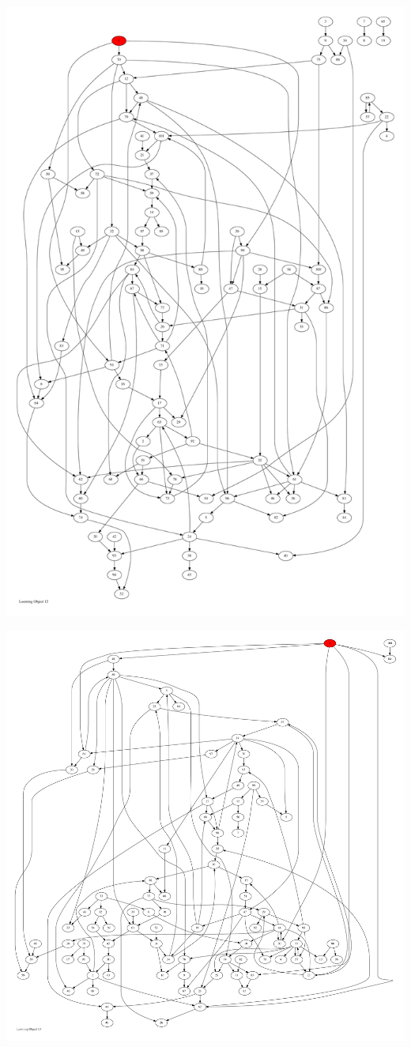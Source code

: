 \documentclass{article}
\begin{document}
\newpage
\includegraphics[max height=\textheight,max width=\textwidth]{looming_object/loom_obj12_pp.pdf}

\newpage
\includegraphics[max height=\textheight,max width=\textwidth]{looming_object/loom_obj13_pp.pdf}
\end{document}
